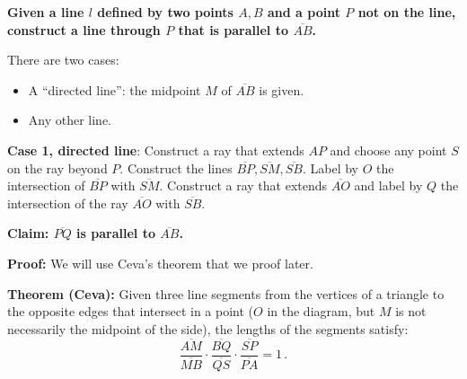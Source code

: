 \textbf{Given a line $l$ defined by two points $A,B$ and a point $P$ not on the line, construct a line through $P$ that is parallel to $\overline{AB}$.}

There are two cases:
\begin{itemize}
\setlength{\itemsep}{0pt}
\item A ``directed line'': the midpoint $M$ of $\overline{AB}$ is given.
\item Any other line.
\end{itemize}

\textbf{Case 1, directed line}: Construct a ray that extends $AP$ and choose any point $S$ on the ray beyond $P$. Construct the lines $\overline{BP}, \overline{SM}, \overline{SB}$. Label by $O$ the intersection of $\overline{BP}$ with $\overline{SM}$. Construct a ray that extends $\overline{AO}$ and label by $Q$ the intersection of the ray $\overline{AO}$ with $\overline{SB}$.

\begin{center}
\vspace*{-8pt}
\vspace*{-6pt}
\end{center}

\textbf{Claim: $\overline{PQ}$ is parallel to $\overline{AB}$.}

\textbf{Proof:} We will use Ceva's theorem that we proof later.

\textbf{Theorem (Ceva):} Given three line segments from the vertices of a triangle to the opposite edges that intersect in a point ($O$ in the diagram, but $M$ is not necessarily the midpoint of the side), the lengths of the segments satisfy:
\[
\frac{\overline{AM}}{\overline{MB}}\cdot\frac{\overline{BQ}}{\overline{QS}}\cdot\frac{\overline{SP}}{\overline{PA}} = 1\,.
\]

